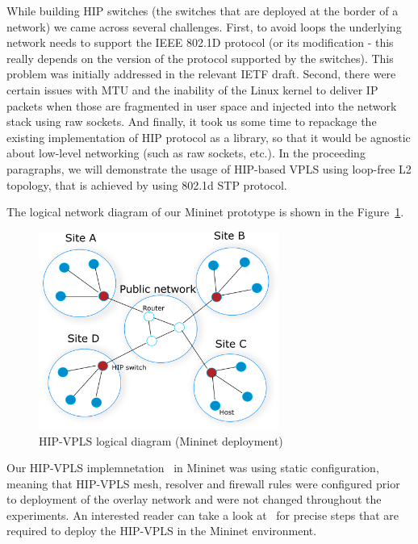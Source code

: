 While building HIP switches (the switches that are deployed at the border of a network) 
we came across several challenges. First, to avoid loops the underlying network needs to support 
the IEEE 802.1D protocol (or its modification - this really depends on the version of the protocol 
supported by the switches). This problem was initially addressed in the relevant IETF draft. 
Second, there were certain issues with MTU and the inability of the Linux kernel to deliver IP 
packets when those are fragmented in user space and injected into the network stack using raw 
sockets. And finally, it took us some time to repackage the existing implementation of HIP protocol 
as a library, so that it would be agnostic about low-level networking (such as raw sockets, etc.). 
In the proceeding paragraphs, we will demonstrate the usage of HIP-based VPLS using loop-free L2 topology,
that is achieved by using 802.1d STP protocol.

The logical network diagram of our Mininet prototype is shown in the Figure~\ref{fig:mininet}.

\begin{figure}[h!]
    \centering
    \includegraphics[width=0.7\textwidth]{graphics/mininet.png}
    \caption{HIP-VPLS logical diagram (Mininet deployment)}
    \label{fig:mininet}
\end{figure}

Our HIP-VPLS implemnetation~\cite{hip-vpls:mininet} in Mininet was using static configuration, meaning that 
HIP-VPLS mesh, resolver and firewall rules were configured prior to deployment 
of the overlay network and were not changed throughout the experiments. An interested reader
can take a look at~\cite{hip-vpls:mininet} for precise steps that are required to 
deploy the HIP-VPLS in the Mininet environment.

